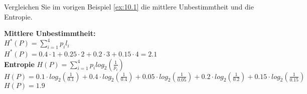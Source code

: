 \begin{uebsp}
\begin{Exercise}[label=ex:10.2]
Vergleichen Sie im vorigen Beispiel \ref{ex:10.1} die mittlere Unbestimmtheit und die
Entropie.
\end{Exercise}
\begin{Answer}
\textbf{Mittlere Unbestimmtheit:}\\
$\displaystyle H^*(P) = \sum_{i=1}^{4}p_i l_i$\\
$\displaystyle H^*(P) =  0.4 \cdot 1 + 0.25 \cdot 2 + 0.2 \cdot 3 + 0.15 \cdot 4 = 2.1$\\
\textbf{Entropie}
$\displaystyle H(P) = \sum_{i=1}^{4} p_i log_2(\frac{1}{p_i})$\\
$\displaystyle H(P) = 0.1 \cdot log_2(\frac{1}{0.1}) + 0.4 \cdot log_2(\frac{1}{0.4}) + 0.05 \cdot log_2(\frac{1}{0.05}) 
+ 0.2 \cdot log_2(\frac{1}{0.2}) + 0.15 \cdot log_2(\frac{1}{0.15})$\\
$H(P) = 1.9$
\end{Answer}
\end{uebsp}
